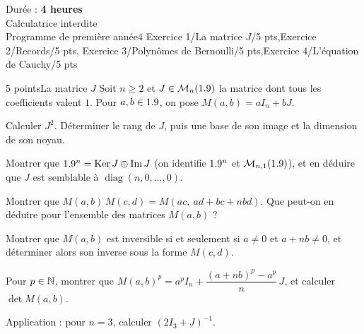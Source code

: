 
  {Durée : \textbf{4 heures}\\Calculatrice interdite\\Programme de première année}{4}
  {Exercice 1/La matrice $J$/5 pts,Exercice 2/Records/5 pts,%
   Exercice 3/Polynômes de Bernoulli/5 pts,Exercice 4/L'équation de Cauchy/5 pts}

\begin{exoEval}{5 points}{La matrice $J$}
Soit $n\geqslant2$ et $J\in\mathcal{M}_n(1.9)$ la matrice dont tous les
coefficients valent $1$. Pour $a,b\in1.9$, on pose $M(a,b)=aI_n+bJ$.
\begin{questions}
  \item Calculer $J^{2}$. Déterminer le rang de $J$, puis une base de son
    image et la dimension de son noyau.
  \item Montrer que $1.9^{n}=\operatorname{Ker}J\oplus\operatorname{Im}J$
    (on identifie $1.9^{n}$ et $\mathcal{M}_{n,1}(1.9)$), et en déduire que
    $J$ est semblable à $\operatorname{diag}(n,0,\dots,0)$.
  \item Montrer que $M(a,b)\,M(c,d)=M(ac,\ ad+bc+nbd)$. Que peut-on en
    déduire pour l'ensemble des matrices $M(a,b)$ ?
  \item Montrer que $M(a,b)$ est inversible si et seulement si $a\neq0$ et
    $a+nb\neq0$, et déterminer alors son inverse sous la forme $M(c,d)$.
  \item Pour $p\in\mathbb{N}$, montrer que
    $M(a,b)^{p}=a^{p}I_n+\dfrac{(a+nb)^{p}-a^{p}}{n}\,J$, et calculer
    $\det M(a,b)$.
  \item Application : pour $n=3$, calculer $(2I_3+J)^{-1}$.
\end{questions}
\end{exoEval}

